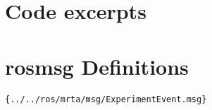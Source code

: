 \documentclass[A4paper,toc=flat]{scrartcl}
\begin{document}
\appendix

\section{Code excerpts}

\section{rosmsg Definitions}

\begin{lstlisting}{../../ros/mrta/msg/ExperimentEvent.msg}
\end{lstlisting}



\end{document}

